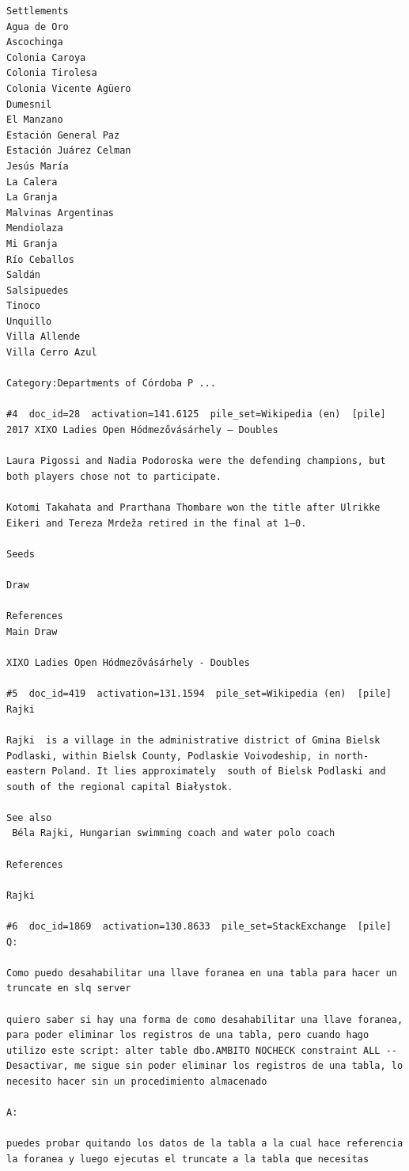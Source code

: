 \begin{verbatim}
Settlements
Agua de Oro
Ascochinga
Colonia Caroya
Colonia Tirolesa
Colonia Vicente Agüero
Dumesnil
El Manzano
Estación General Paz
Estación Juárez Celman
Jesús María
La Calera
La Granja
Malvinas Argentinas
Mendiolaza
Mi Granja
Río Ceballos
Saldán
Salsipuedes
Tinoco
Unquillo
Villa Allende
Villa Cerro Azul

Category:Departments of Córdoba P ...

#4  doc_id=28  activation=141.6125  pile_set=Wikipedia (en)  [pile]
2017 XIXO Ladies Open Hódmezővásárhely – Doubles

Laura Pigossi and Nadia Podoroska were the defending champions, but both players chose not to participate.

Kotomi Takahata and Prarthana Thombare won the title after Ulrikke Eikeri and Tereza Mrdeža retired in the final at 1–0.

Seeds

Draw

References
Main Draw

XIXO Ladies Open Hódmezővásárhely - Doubles

#5  doc_id=419  activation=131.1594  pile_set=Wikipedia (en)  [pile]
Rajki

Rajki  is a village in the administrative district of Gmina Bielsk Podlaski, within Bielsk County, Podlaskie Voivodeship, in north-eastern Poland. It lies approximately  south of Bielsk Podlaski and  south of the regional capital Białystok.

See also
 Béla Rajki, Hungarian swimming coach and water polo coach

References

Rajki

#6  doc_id=1869  activation=130.8633  pile_set=StackExchange  [pile]
Q:

Como puedo desahabilitar una llave foranea en una tabla para hacer un truncate en slq server

quiero saber si hay una forma de como desahabilitar una llave foranea, para poder eliminar los registros de una tabla, pero cuando hago utilizo este script: alter table dbo.AMBITO NOCHECK constraint ALL --Desactivar, me sigue sin poder eliminar los registros de una tabla, lo necesito hacer sin un procedimiento almacenado 

A:

puedes probar quitando los datos de la tabla a la cual hace referencia la foranea y luego ejecutas el truncate a la tabla que necesitas




\end{verbatim}
